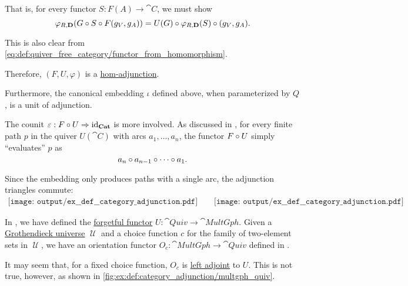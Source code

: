 \begin{example}
\begin{thmenum}
    That is, for every functor \( S: F(A) \to \cat{C} \), we must show
    \begin{equation*}
      \varphi_{R, \cat{D}}(G \bincirc S \bincirc F(g_V, g_A))
      =
      U(G) \bincirc \varphi_{R, \cat{D}}(S) \bincirc (g_V, g_A).
    \end{equation*}

    This is also clear from \eqref{eq:def:quiver_free_category/functor_from_homomorphism}.

    Therefore, \( (F, U, \varphi) \) is a \hyperref[def:category_adjunction/hom]{hom-adjunction}.

    Furthermore, the canonical embedding \( \iota \) defined above, when parameterized by \( Q \), is a unit of adjunction.

    The counit  \( \varepsilon: F \bincirc U \Rightarrow \id_{\cat{Cat}} \) is more involved. As discussed in , for every finite path \( p \) in the quiver \( U(\cat{C}) \) with arcs \( a_1, \ldots, a_n \), the functor \( F \bincirc U \) simply \enquote{evaluates} \( p \) as
    \begin{equation*}
      a_n \bincirc a_{n-1} \bincirc \cdots \bincirc a_1.
    \end{equation*}

    Since the embedding only produces paths with a single arc, the adjunction triangles commute:
    \begin{equation}\label{eq:ex:def:category_adjunction/quiv_cat/triangles}
      \begin{aligned}
        \texttt{[image: output/ex\_\_def\_\_category\_adjunction.pdf]}
        \quad\quad
        \texttt{[image: output/ex\_\_def\_\_category\_adjunction.pdf]}
      \end{aligned}
    \end{equation}

     In , we have defined the \hyperref[def:concrete_category]{forgetful functor} \( U: \hyperref[def:category_of_small_quivers]{\cat{Quiv}} \to \hyperref[def:undirected_multigraph]{\cat{MultGph}} \). Given a \hyperref[def:grothendieck_universe]{Grothendieck universe} \( \mscrU \) and a choice function \( c \) for the family of two-element sets in \( \mscrU \), we have an orientation functor \( O_c: \cat{MultGph} \to \cat{Quiv} \) defined in .

    It may seem that, for a fixed choice function, \( O_c \) is \hyperref[def:category_adjunction]{left adjoint} to \( U \). This is not true, however, as shown in \cref{fig:ex:def:category_adjunction/multgph_quiv}.


\end{thmenum}
\end{example}
